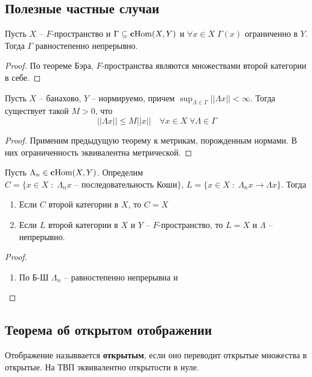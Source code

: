 \documentclass[12pt, a4paper, oneside]{book}
\begin{document}
\subsection{Полезные частные случаи}
\begin{theorem}
    Пусть $X$ -- $F$-пространство и $\Gamma \subseteq \text{\textbf{c}Hom}(X,Y)$ и $\forall x \in X \; \Gamma(x)$ ограниченно в $Y$.
    Тогда $\Gamma$ равностепенно непрерывно.
\end{theorem}
\begin{proof}
По теореме Бэра, $F$-пространства являются множествами второй категории в себе.
\end{proof}
\begin{theorem}
    Пусть $X$ -- банахово, $Y$ -- нормируемо, причем $\sup_{\Lambda \in \Gamma} ||\Lambda x || < \infty$. Тогда существует такой $M > 0$, что
    $$||\Lambda x|| \leqslant M ||x||\quad \forall x \in X \; \forall \Lambda \in \Gamma$$
\end{theorem}
\begin{proof}
Применим предыдущую теорему к метрикам, порожденным нормами. В них ограниченность эквивалентна метрической.
\end{proof}
\begin{theorem}
    Пусть $\Lambda_n \in \text{\textbf{c}Hom}(X,Y)$. Определим $C = \{x \in X\; : \; \Lambda_n x \text{ -- последовательность Коши}   \}$, $L = \{x \in X \; : \; \Lambda_n x \to \Lambda x \}$.
    Тогда
    \begin{enumerate}
        \item Если $C$ второй категории в $X$, то $C = X$
        \item Если $L$ второй категории в $X$ и $Y$ -- $F$-пространство, то $L = X$ и $\Lambda$ -- непрерывно.
    \end{enumerate}
\end{theorem}
\begin{proof}
\begin{enumerate}
    \item По Б-Ш $\Lambda_n$ -- равностепенно непрерывна и
\end{enumerate}
\end{proof}

\subsection{Теорема об открытом отображении}
Отображение назыввается \textbf{открытым}, если оно переводит открытые множества в открытые. На ТВП эквивалентно открытости в нуле.
\end{document}
